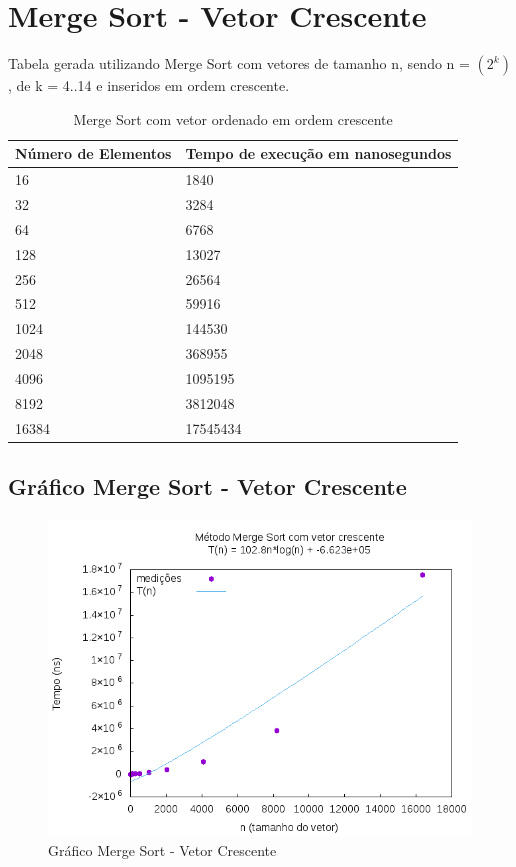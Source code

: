 \documentclass[12pt,a4paper,twoside]{report}
\begin{document}
\section{Merge Sort - Vetor Crescente}
Tabela gerada utilizando Merge Sort com vetores de tamanho n, sendo n = $(2^k)$, de k = 4..14 e inseridos em ordem crescente.
\begin{table}[H]
\centering
\caption{Merge Sort com vetor ordenado em ordem crescente}
\label{my-label}
\begin{tabular}{|l|l|}
\hline
\multicolumn{1}{|c|}{\textbf{Número de Elementos}} & \multicolumn{1}{c|}{\textbf{Tempo de execução em nanosegundos}} \\ \hline
16 & 1840 \\ \hline
32 & 3284 \\ \hline
64 & 6768 \\ \hline
128 & 13027 \\ \hline
256 & 26564 \\ \hline
512 & 59916 \\ \hline
1024 & 144530 \\ \hline
2048 & 368955 \\ \hline
4096 & 1095195 \\ \hline
8192 & 3812048 \\ \hline
16384 & 17545434 \\ \hline
\end{tabular}
\end{table}

\subsection{Gráfico Merge Sort - Vetor Crescente}
\begin{figure}[H]
    \centering
    \includegraphics[width=0.7\linewidth]{graficos/MergeSort/vIntCrescente/vIntCrescente.png}
  \caption{Gráfico Merge Sort - Vetor Crescente}
\end{figure}
\end{document}
